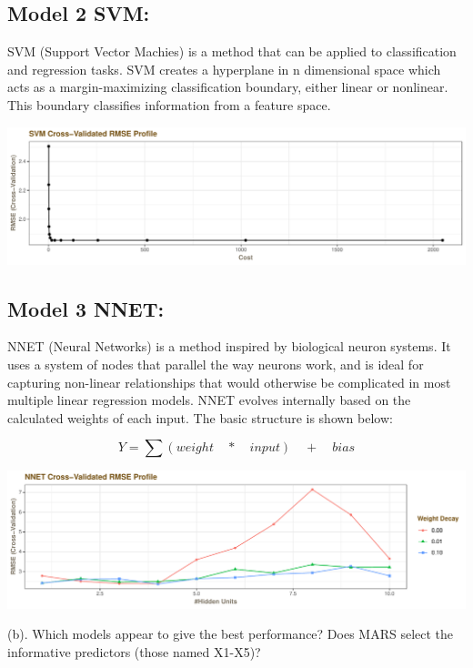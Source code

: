 \documentclass[]{report}
\begin{document}
\subsection{Model 2 SVM:}\label{model-2-svm}

SVM (Support Vector Machies) is a method that can be applied to
classification and regression tasks. SVM creates a hyperplane in n
dimensional space which acts as a margin-maximizing classification
boundary, either linear or nonlinear. This boundary classifies
information from a feature space.

\includegraphics{Homework-Two2_files/figure-latex/kj-7.2-2-1.pdf}

\subsection{Model 3 NNET:}\label{model-3-nnet}

NNET (Neural Networks) is a method inspired by biological neuron
systems. It uses a system of nodes that parallel the way neurons work,
and is ideal for capturing non-linear relationships that would otherwise
be complicated in most multiple linear regression models. NNET evolves
internally based on the calculated weights of each input. The basic
structure is shown below:

\[
Y=\sum { (weight\quad *\quad input)\quad +\quad bias } 
\]

\includegraphics{Homework-Two2_files/figure-latex/kj-7.2-3-1.pdf}

\begin{subquestion}{(b).}
Which models appear to give the best performance? Does MARS select the informative predictors (those named X1-X5)?
\end{subquestion}
\end{document}
